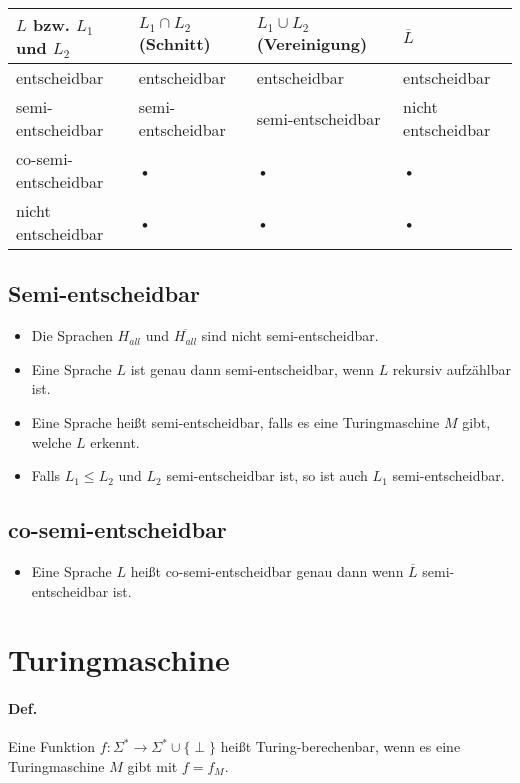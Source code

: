 \begin{table}[htb!]
\centering
\begin{tabular}{l|l|l|l}
$L$ bzw. $L_1$ und $L_2$ & $L_1 \cap L_2$ (Schnitt) & $L_1 \cup L_2$ (Vereinigung) & $\overline{L}$ \\
\hline
entscheidbar & entscheidbar & entscheidbar & entscheidbar \\
semi-entscheidbar & semi-entscheidbar & semi-entscheidbar & nicht entscheidbar \\
co-semi-entscheidbar & • & • & • \\
nicht entscheidbar & • & • & • \\
\end{tabular} 
\end{table}

\subsection{Semi-entscheidbar}

\begin{itemize}
	\item Die Sprachen $H_{all}$ und $\overline{H_{all}}$ sind nicht semi-entscheidbar.
	\item Eine Sprache $L$ ist genau dann semi-entscheidbar, wenn $L$ rekursiv aufzählbar ist.
	\item Eine Sprache heißt semi-entscheidbar, falls es eine Turingmaschine $M$ gibt, welche $L$ erkennt.
	\item Falls $L_1 \leq L_2$ und $L_2$ semi-entscheidbar ist, so ist auch $L_1$ semi-entscheidbar.
\end{itemize}

\subsection{co-semi-entscheidbar}

\begin{itemize}
	\item Eine Sprache $L$ heißt co-semi-entscheidbar genau dann wenn $\overline{L}$ semi-entscheidbar ist.
\end{itemize}


\section{Turingmaschine}
\paragraph*{Def.} Eine Funktion $f:\Sigma^* \rightarrow\Sigma^* \cup \{ \perp \}$ heißt Turing-berechenbar, wenn es eine Turingmaschine $M$ gibt mit $f=f_M$.
